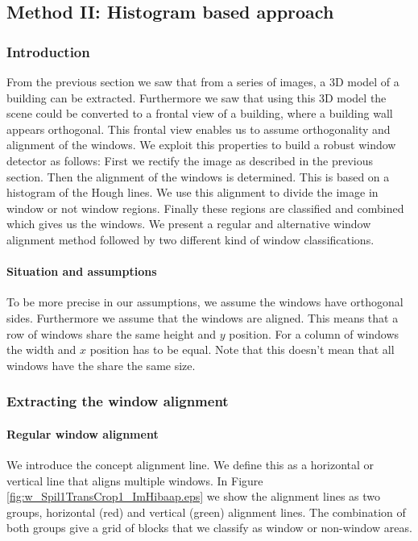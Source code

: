 \subsection{Method II: Histogram based approach} 
\label{sec:method2}
\subsubsection{Introduction}
From the previous section we saw that from a series of images, a 3D model of a
building can be extracted. Furthermore we saw that using this 3D model the
scene could be converted to a frontal view of a building, where a building wall
appears orthogonal.  This frontal view enables us to assume orthogonality and
alignment of the windows.  We exploit this properties to build a robust window
detector as follows:
First we rectify the image as described in the previous section.  Then the alignment of the windows
is determined. This is based on a histogram of the Hough lines. We use this
alignment to divide the image in window or not window regions.  Finally these
regions are classified and combined which gives us the windows.
We present a regular and alternative window alignment method
followed by two different kind of window classifications. 


\paragraph{Situation and assumptions}
To be more precise in our assumptions, we assume the windows have orthogonal
sides.  Furthermore we assume that the windows are aligned. This means that a
row of windows share the same height and $y$ position. For a column of windows
the width and $x$ position has to be equal.  Note that this doesn't mean that
all windows have the share the same size.



\subsubsection{Extracting the window alignment}
\paragraph{Regular window alignment}
We introduce the concept alignment line. We define this as a horizontal or
vertical line that aligns multiple windows. In Figure
\ref{fig:w_Spil1TransCrop1_ImHibaap.eps}
we show the alignment lines as two groups, horizontal (red) and
vertical (green) alignment lines.  The combination of both groups give a grid of
blocks that we classify as window or non-window areas.\\

